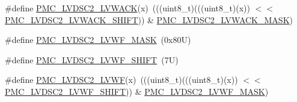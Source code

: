 \begin{DoxyCompactItemize}
\item 
\#define \mbox{\hyperlink{group___p_m_c___register___masks_ga487c1af0f694e53be64251c1862e8d9c}{P\+M\+C\+\_\+\+L\+V\+D\+S\+C2\+\_\+\+L\+V\+W\+A\+CK}}(x)~(((uint8\+\_\+t)(((uint8\+\_\+t)(x)) $<$$<$ \mbox{\hyperlink{group___p_m_c___register___masks_ga99ad1d373a7be7591a7ee3577bed5374}{P\+M\+C\+\_\+\+L\+V\+D\+S\+C2\+\_\+\+L\+V\+W\+A\+C\+K\+\_\+\+S\+H\+I\+FT}})) \& \mbox{\hyperlink{group___p_m_c___register___masks_ga8b0c8bcad4d38e6ff797e9bc3d9db6d7}{P\+M\+C\+\_\+\+L\+V\+D\+S\+C2\+\_\+\+L\+V\+W\+A\+C\+K\+\_\+\+M\+A\+SK}})
\item 
\#define \mbox{\hyperlink{group___p_m_c___register___masks_ga34187b0598a3e166a457818770a616d4}{P\+M\+C\+\_\+\+L\+V\+D\+S\+C2\+\_\+\+L\+V\+W\+F\+\_\+\+M\+A\+SK}}~(0x80\+U)
\item 
\#define \mbox{\hyperlink{group___p_m_c___register___masks_ga8bcfb9fc5fd4a92164b2aa6cdb6db77e}{P\+M\+C\+\_\+\+L\+V\+D\+S\+C2\+\_\+\+L\+V\+W\+F\+\_\+\+S\+H\+I\+FT}}~(7\+U)
\item 
\#define \mbox{\hyperlink{group___p_m_c___register___masks_ga674f52d0325d911bf7dd91bf47b708f4}{P\+M\+C\+\_\+\+L\+V\+D\+S\+C2\+\_\+\+L\+V\+WF}}(x)~(((uint8\+\_\+t)(((uint8\+\_\+t)(x)) $<$$<$ \mbox{\hyperlink{group___p_m_c___register___masks_ga8bcfb9fc5fd4a92164b2aa6cdb6db77e}{P\+M\+C\+\_\+\+L\+V\+D\+S\+C2\+\_\+\+L\+V\+W\+F\+\_\+\+S\+H\+I\+FT}})) \& \mbox{\hyperlink{group___p_m_c___register___masks_ga34187b0598a3e166a457818770a616d4}{P\+M\+C\+\_\+\+L\+V\+D\+S\+C2\+\_\+\+L\+V\+W\+F\+\_\+\+M\+A\+SK}})
\end{DoxyCompactItemize}
